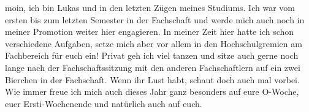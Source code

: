 \begin{multicols*}{2}
{moin, ich bin Lukas und in den letzten Zügen meines Studiums. Ich war
vom ersten bis zum letzten Semester in der Fachschaft und werde mich
auch noch in meiner Promotion weiter hier engagieren.
In meiner Zeit hier hatte ich schon verschiedene Aufgaben, setze mich
aber vor allem in den Hochschulgremien am Fachbereich für euch ein!
Privat geh ich viel tanzen und sitze auch gerne noch lange nach der
Fachschaftssitzung mit den anderen Fachschaftlern auf ein zwei Bierchen
in der Fachschaft. Wenn ihr Lust habt, schaut doch auch mal vorbei. Wie
immer freue ich mich auch dieses Jahr ganz besonders auf eure O-Woche,
euer Ersti-Wochenende und natürlich auch auf euch.}


\end{multicols*}

